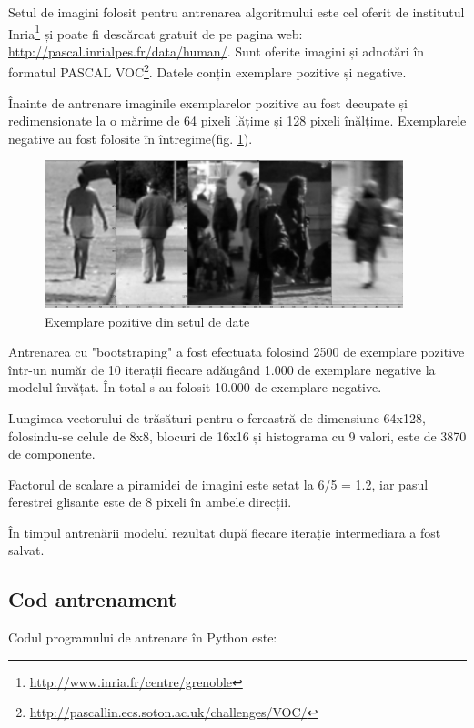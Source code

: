 Setul de imagini folosit pentru antrenarea algoritmului este cel oferit de institutul Inria\footnote{\url{http://www.inria.fr/centre/grenoble}} și poate fi descărcat gratuit de pe pagina web: \url{http://pascal.inrialpes.fr/data/human/}. 
Sunt oferite imagini și adnotări în formatul PASCAL VOC\footnote{\url{http://pascallin.ecs.soton.ac.uk/challenges/VOC/}}.
Datele conțin exemplare pozitive și negative.
%

Înainte de antrenare imaginile exemplarelor pozitive au fost decupate și redimensionate la o mărime de 64 pixeli lățime și 128 pixeli înălțime.
Exemplarele negative au fost folosite în întregime(fig. \ref{fig:exemplare_pozitive_inria_person}).

\begin{figure}[H]
	\centering
		\includegraphics[width=0.93\textwidth]{imagini/exemplare_pozitive_inria_person.png}
	\caption{Exemplare pozitive din setul de date}
	\label{fig:exemplare_pozitive_inria_person}
\end{figure}


Antrenarea cu "bootstraping" a fost efectuata folosind 2500 de exemplare pozitive într-un număr de 10 iterații fiecare adăugând 1.000 de exemplare negative la modelul învățat. În total s-au folosit 10.000 de exemplare negative.

Lungimea vectorului de trăsături pentru o fereastră de dimensiune 64x128, folosindu-se celule de 8x8, blocuri de 16x16 și histograma cu 9 valori, este de 3870 de componente.

Factorul de scalare a piramidei de imagini este setat la 6/5 = 1.2, iar pasul ferestrei glisante este de 8 pixeli în ambele direcții.

În timpul antrenării modelul rezultat după fiecare iterație intermediara a fost salvat.

\subsection{Cod antrenament}
Codul programului de antrenare în Python este:


